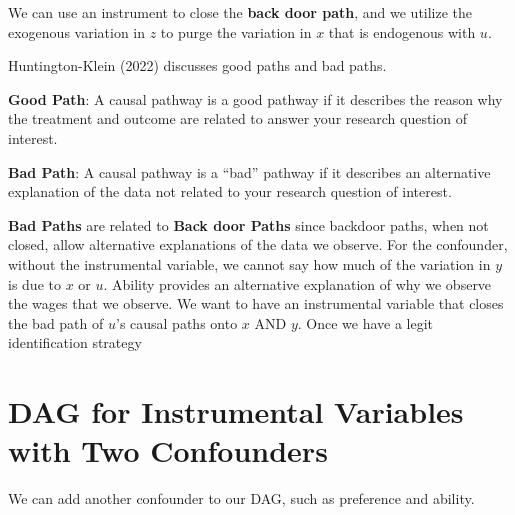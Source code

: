 \documentclass[
]{book}
\begin{document}
We can use an instrument to close the \textbf{back door path}, and we utilize the exogenous variation in \(z\) to purge the variation in \(x\) that is endogenous with \(u\).

Huntington-Klein (2022) discusses good paths and bad paths.

\textbf{Good Path}: A causal pathway is a good pathway if it describes the reason why the treatment and outcome are related to answer your research question of interest.

\textbf{Bad Path}: A causal pathway is a ``bad'' pathway if it describes an alternative explanation of the data not related to your research question of interest.

\textbf{Bad Paths} are related to \textbf{Back door Paths} since backdoor paths, when not closed, allow alternative explanations of the data we observe. For the confounder, without the instrumental variable, we cannot say how much of the variation in \(y\) is due to \(x\) or \(u\). Ability provides an alternative explanation of why we observe the wages that we observe. We want to have an instrumental variable that closes the bad path of \(u\)'s causal paths onto \(x\) AND \(y\). Once we have a legit identification strategy

\section{DAG for Instrumental Variables with Two Confounders}\label{dag-for-instrumental-variables-with-two-confounders}

We can add another confounder to our DAG, such as preference and ability.
\end{document}
